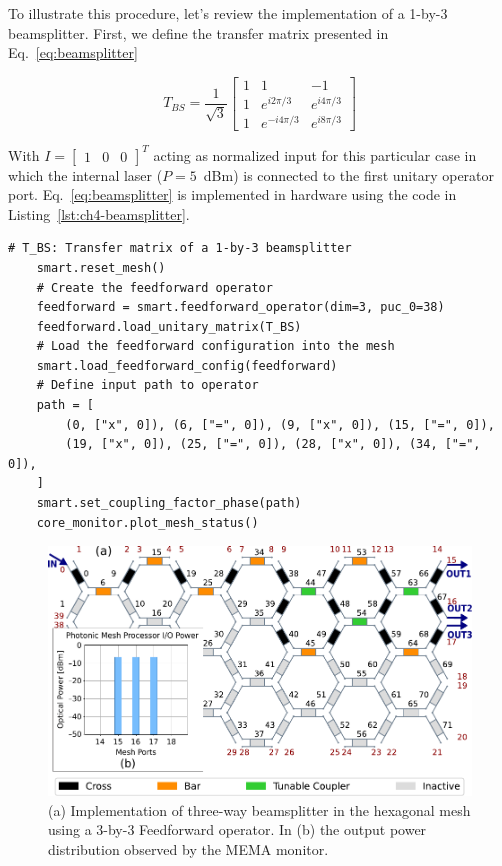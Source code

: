 To illustrate this procedure, let's review the implementation of a 1-by-3 beamsplitter.
First, we define the transfer matrix presented in Eq.~\eqref{eq:beamsplitter}

\begin{equation}
	\label{eq:beamsplitter}
	T_{BS} = \frac{1}{\sqrt{3}} \begin{bmatrix}
		1 & 1            & -1          \\
		1 & e^{i2\pi/3}  & e^{i4\pi/3} \\
		1 & e^{-i4\pi/3} & e^{i8\pi/3}
	\end{bmatrix}
\end{equation}

With \(I = \begin{bmatrix} 1 & 0 & 0 \end{bmatrix}^T\) acting as normalized input for this particular case in which the internal laser (\(P=5\)~dBm) is connected to the first unitary operator port.
Eq.~\eqref{eq:beamsplitter} is implemented in hardware using the code in Listing~\ref{lst:ch4-beamsplitter}.

\begin{lstlisting}[caption={Implementation of a three-way beamsplitter using a Feedforward operator},
label={lst:ch4-beamsplitter}]
	# T_BS: Transfer matrix of a 1-by-3 beamsplitter
	smart.reset_mesh()
	# Create the feedforward operator
	feedforward = smart.feedforward_operator(dim=3, puc_0=38)
	feedforward.load_unitary_matrix(T_BS)
	# Load the feedforward configuration into the mesh
	smart.load_feedforward_config(feedforward)
	# Define input path to operator
	path = [
		(0, ["x", 0]), (6, ["=", 0]), (9, ["x", 0]), (15, ["=", 0]),
		(19, ["x", 0]), (25, ["=", 0]), (28, ["x", 0]), (34, ["=", 0]),
	]
	smart.set_coupling_factor_phase(path)
	core_monitor.plot_mesh_status()
\end{lstlisting}

\begin{figure}
	\begin{center}
		\includegraphics{figures/ch4-3split_mema.pdf}
	\end{center}
	\caption{(a) Implementation of three-way beamsplitter in the hexagonal mesh using a 3-by-3  Feedforward
		operator.
		In (b) the output power distribution observed by the MEMA monitor.
	}\label{fig:ch4-3split} \end{figure}

